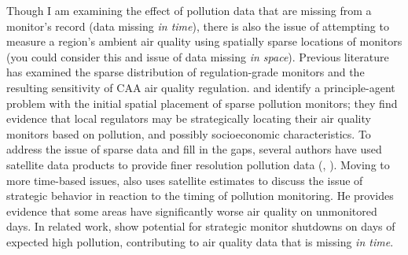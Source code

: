 


Though I am examining the effect of pollution data that are missing from a monitor's record (data missing \textit{in time}), there is also the issue of attempting to measure a region's ambient air quality using spatially sparse locations of monitors (you could consider this and issue of data missing \textit{in space}).
%
Previous literature has examined the sparse distribution of regulation-grade monitors and the resulting sensitivity of CAA air quality regulation.
\cite{graingerRegulatorsStrategicallyAvoid2019} and \cite{graingerDiscriminationAmbientAir2019} identify a principle-agent problem with the initial spatial placement of sparse pollution monitors; they find evidence that local regulators may be strategically locating their air quality monitors based on pollution, and possibly socioeconomic characteristics. 
To address the issue of sparse data and fill in the gaps, several authors have used satellite data products to provide finer resolution pollution data (\citealt{sullivanUsingSatelliteData2018}, \citealt{fowlieBringingSatelliteBasedAir2019}).
Moving to more time-based issues, \cite{zouUnwatchedPollutionEffect2021} also uses satellite estimates to discuss the issue of strategic behavior in reaction to the timing of pollution monitoring. He provides evidence that some areas have significantly worse air quality on unmonitored days.
In related work, \cite{muWhatMissingEnvironmental2021} show potential for strategic monitor shutdowns on days of expected high pollution, contributing to air quality data that is missing \textit{in time}.










